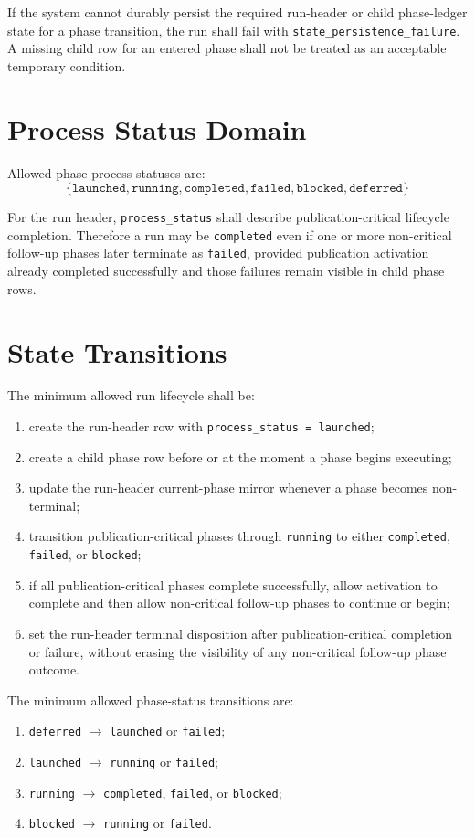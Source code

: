 If the system cannot durably persist the required run-header or child phase-ledger state for a phase transition, the run shall fail with \texttt{state\_persistence\_failure}. A missing child row for an entered phase shall not be treated as an acceptable temporary condition.

\section{Process Status Domain}
Allowed phase process statuses are:
\[
\{\texttt{launched}, \texttt{running}, \texttt{completed}, \texttt{failed}, \texttt{blocked}, \texttt{deferred}\}
\]

For the run header, \texttt{process\_status} shall describe publication-critical lifecycle completion. Therefore a run may be \texttt{completed} even if one or more non-critical follow-up phases later terminate as \texttt{failed}, provided publication activation already completed successfully and those failures remain visible in child phase rows.

\section{State Transitions}
The minimum allowed run lifecycle shall be:
\begin{enumerate}[leftmargin=1.2cm]
    \item create the run-header row with \texttt{process\_status = launched};
    \item create a child phase row before or at the moment a phase begins executing;
    \item update the run-header current-phase mirror whenever a phase becomes non-terminal;
    \item transition publication-critical phases through \texttt{running} to either \texttt{completed}, \texttt{failed}, or \texttt{blocked};
    \item if all publication-critical phases complete successfully, allow activation to complete and then allow non-critical follow-up phases to continue or begin;
    \item set the run-header terminal disposition after publication-critical completion or failure, without erasing the visibility of any non-critical follow-up phase outcome.
\end{enumerate}

The minimum allowed phase-status transitions are:
\begin{enumerate}[leftmargin=1.2cm]
    \item \texttt{deferred} \(\rightarrow\) \texttt{launched} or \texttt{failed};
    \item \texttt{launched} \(\rightarrow\) \texttt{running} or \texttt{failed};
    \item \texttt{running} \(\rightarrow\) \texttt{completed}, \texttt{failed}, or \texttt{blocked};
    \item \texttt{blocked} \(\rightarrow\) \texttt{running} or \texttt{failed}.
\end{enumerate}


